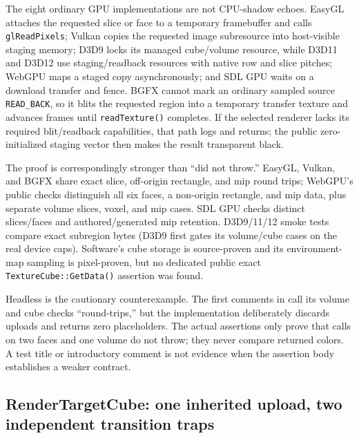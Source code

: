The eight ordinary GPU implementations are not CPU-shadow echoes. EasyGL attaches the
requested slice or face to a temporary framebuffer and calls \texttt{glReadPixels}; Vulkan
copies the requested image subresource into host-visible staging memory; D3D9 locks its
managed cube/volume resource, while D3D11 and D3D12 use staging/readback resources with
native row and slice pitches; WebGPU maps a staged copy asynchronously; and SDL GPU waits on
a download transfer and fence. BGFX cannot mark an ordinary sampled source
\texttt{READ\_BACK}, so it blits the requested region into a temporary transfer texture and
advances frames until \texttt{readTexture()} completes. If the selected renderer lacks its
required blit/readback capabilities, that path logs and returns; the public zero-initialized
staging vector then makes the result transparent black.

The proof is correspondingly stronger than ``did not throw.'' EasyGL, Vulkan, and BGFX
share exact slice, off-origin rectangle, and mip round trips; WebGPU's public checks
distinguish all six faces, a non-origin rectangle, and mip data, plus separate volume slices,
voxel, and mip cases. SDL GPU checks distinct slices/faces and authored/generated mip
retention. D3D9/11/12 smoke tests compare exact subregion bytes (D3D9 first gates its
volume/cube cases on the real device caps). Software's cube storage is source-proven and its
environment-map sampling is pixel-proven, but no dedicated public exact
\texttt{TextureCube::GetData()} assertion was found.

Headless is the cautionary counterexample. The first comments in
 call its volume and cube checks ``round-trips,''
but the implementation deliberately discards uploads and returns zero placeholders. The
actual assertions only prove that calls on two faces and one volume do not throw; they never
compare returned colors. A test title or introductory comment is not evidence when the
assertion body establishes a weaker contract.

\subsection{RenderTargetCube: one inherited upload, two independent transition traps}
\label{sec:rendertargetcube-default-contracts}


